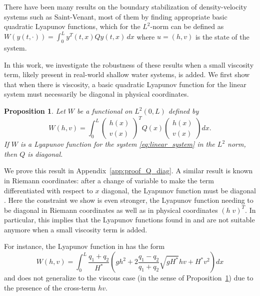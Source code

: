 \documentclass[11pt]{article}
\newtheorem{proposition}{Proposition}[section]
\begin{document}
There have been many results on the boundary stabilization of density-velocity systems such as Saint-Venant, most of them by finding appropriate 
basic quadratic Lyapunov functions, which for the $L^2$-norm can be defined as ${W}(y(t, \cdot)) = \int_0^L y^T(t,x) Q y(t,x) \, dx$ where $u=(h,v)$ is the state of the system.

In this work, we investigate the robustness of these results when a small viscosity term, likely present in real-world shallow water systems, is added. We {first} show that when there is viscosity, a basic quadratic Lyapunov function {for the linear system} must necessarily be diagonal in physical coordinates.

\begin{proposition}
Let ${W}$ be a functional on $L^{2}(0,L)$ defined by
\begin{equation}
    {W}(h,v) = \int_{0}^{L} \begin{pmatrix}h{(x)}\\ v{(x)}\end{pmatrix}^{T} Q{(x)} \begin{pmatrix}h{(x)}\\ v{(x)}\end{pmatrix} dx.
\end{equation}
If ${W}$ is a Lyapunov function for the system \eqref{eq:linear_system} in the $L^{2}$ norm, 
then $Q$ is diagonal.
\label{prop:Q_diag}
\end{proposition}
 
{We prove this result in Appendix~\ref{app:proof_Q_diag}.}
A similar result is known in Riemann coordinates: after a change of variable to make the term differentiated with respect to $x$ diagonal, the Lyapunov function must be diagonal \cite{bastin2011boundary}. Here the constraint we show is even stronger, the Lyapunov function needing to be diagonal {in Riemann coordinates as well as} in physical coordinates $(h \; v)^T$. In particular, this implies that the Lyapunov functions found in \cite{hayat2019quadratic} and \cite{hayat2021exponential} are not suitable anymore when a small viscosity term is added.

{ For instance, the Lyapunov function in \cite[Proposition 4]{hayat2019quadratic} has the form
{\small \[ W(h,v) = \int_0^L \frac{q_1 + q_2}{H^*} \left( gh^2 + 2 \frac{q_1 - q_2}{q_1 + q_2} \sqrt{gH^*}hv + H^*v^2 \right) dx \]}
and does not generalize to the viscous case (in the sense of Proposition~\ref{prop:Q_diag}) due to the presence of the cross-term $hv$.  
}
\end{document}
